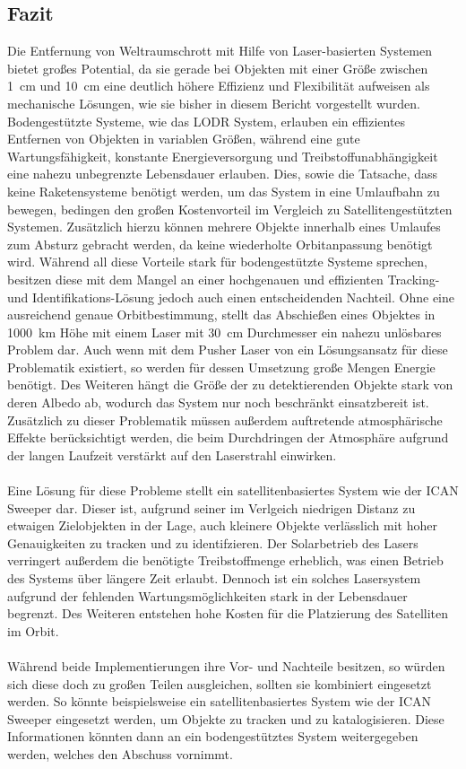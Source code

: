 \documentclass{article}
\begin{document}
\subsection{Fazit}
Die Entfernung von Weltraumschrott mit Hilfe von Laser-basierten Systemen bietet großes Potential, da sie gerade bei Objekten mit einer Größe zwischen \SI{1}{\centi\meter} und \SI{10}{\centi\meter} eine deutlich höhere Effizienz und Flexibilität aufweisen als mechanische Lösungen, wie sie bisher in diesem Bericht vorgestellt wurden. Bodengestützte Systeme, wie das LODR System, erlauben ein effizientes Entfernen von Objekten in variablen Größen, während eine gute Wartungsfähigkeit, konstante Energieversorgung und Treibstoffunabhängigkeit eine nahezu unbegrenzte Lebensdauer erlauben. Dies, sowie die Tatsache, dass keine Raketensysteme benötigt werden, um das System in eine Umlaufbahn zu bewegen, bedingen den großen Kostenvorteil im Vergleich zu Satellitengestützten Systemen. Zusätzlich hierzu können mehrere Objekte innerhalb eines Umlaufes zum Absturz gebracht werden, da keine wiederholte Orbitanpassung benötigt wird. Während all diese Vorteile stark für bodengestützte Systeme sprechen, besitzen diese mit dem Mangel an einer hochgenauen und effizienten Tracking- und Identifikations-Lösung jedoch auch einen entscheidenden Nachteil. Ohne eine ausreichend genaue Orbitbestimmung, stellt das Abschießen eines Objektes in \SI{1000}{\kilo\meter} Höhe mit einem Laser mit \SI{30}{\centi\meter} Durchmesser ein nahezu unlösbares Problem dar. Auch wenn mit dem Pusher Laser von \citet{p11q11orion} ein Lösungsansatz für diese Problematik existiert, so werden für dessen Umsetzung große Mengen Energie benötigt. Des Weiteren hängt die Größe der zu detektierenden Objekte stark von deren Albedo ab, wodurch das System nur noch beschränkt einsatzbereit ist. Zusätzlich zu dieser Problematik müssen außerdem auftretende atmosphärische Effekte berücksichtigt werden, die beim Durchdringen der Atmosphäre aufgrund der langen Laufzeit verstärkt auf den Laserstrahl einwirken.\\\\
\noindent Eine Lösung für diese Probleme stellt ein satellitenbasiertes System wie der ICAN Sweeper dar. Dieser ist, aufgrund seiner im Verlgeich niedrigen Distanz zu etwaigen Zielobjekten in der Lage, auch kleinere Objekte verlässlich mit hoher Genauigkeiten zu tracken und zu identifzieren. Der Solarbetrieb des Lasers verringert außerdem die benötigte Treibstoffmenge erheblich, was einen Betrieb des Systems über längere Zeit erlaubt. Dennoch ist ein solches Lasersystem aufgrund der fehlenden Wartungsmöglichkeiten stark in der Lebensdauer begrenzt. Des Weiteren entstehen hohe Kosten für die Platzierung des Satelliten im Orbit.\\\\
\noindent Während beide Implementierungen ihre Vor- und Nachteile besitzen, so würden sich diese doch zu großen Teilen ausgleichen, sollten sie kombiniert eingesetzt werden. So könnte beispielsweise ein satellitenbasiertes System wie der ICAN Sweeper eingesetzt werden, um Objekte zu tracken und zu katalogisieren. Diese Informationen könnten dann an ein bodengestütztes System weitergegeben werden, welches den Abschuss vornimmt.
\end{document}

